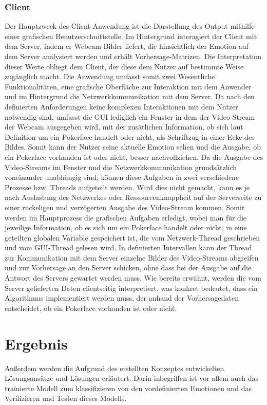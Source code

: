 \documentclass[12pt, a4paper]{scrbook}
\begin{document}
\subsection{Client}
Der Hauptzweck des Client-Anwendung ist die Darstellung des Output mithilfe einer grafischen Benutzerschnittstelle. Im Hintergrund interagiert der Client mit dem Server, indem er Webcam-Bilder liefert, die hinsichtlich der Emotion auf dem Server analysiert werden und erhält Vorhersage-Matrizen. Die Interpretation dieser Werte obliegt dem Client, der diese dem Nutzer auf bestimmte Weise zugänglich macht. Die Anwendung umfasst somit zwei Wesentliche Funktionalitäten, eine grafische Oberfläche zur Interaktion mit dem Anwender und im Hintergrund die Netzwerkkommunikation mit dem Server. Da nach den definierten Anforderungen keine komplexen Interaktionen mit dem Nutzer notwendig sind, umfasst die GUI lediglich ein Fenster in dem der Video-Stream der Webcam ausgegeben wird, mit der zusätlichen Information, ob sich laut Definition um ein Pokerface handelt oder nicht, als Schriftzug in einer Ecke des Bildes. Somit kann der Nutzer seine aktuelle Emotion sehen und die Ausgabe, ob ein Pokerface vorhanden ist oder nicht, besser nachvollziehen. Da die Ausgabe des Video-Streams im Fenster und die Netzwerkkommunikation grundsätzlich voneinander unabhängig sind, können diese Aufgaben in zwei verschiedene Prozesse bzw. Threads aufgeteilt werden. Wird dies nicht gemacht, kann es je nach Auslastung des Netzwerkes oder Ressourcenknappheit auf der Serverseite zu einer ruckeligen und verzögerten Ausgabe des Video-Stream kommen. Somit werden im Hauptprozess die grafischen Aufgaben erledigt, wobei man für die jeweilige Information, ob es sich um ein Pokerface handelt oder nicht, in eine geteilten globalen Variable gespeichert ist, die vom Netzwerk-Thread geschrieben und vom GUI-Thread gelesen wird. In definierten Intervallen kann der Thread zur Kommunikation mit dem Server einzelne Bilder des Video-Streams abgreifen und zur Vorhersage an den Server schicken, ohne dass bei der Ausgabe auf die Antwort des Servers gewartet werden muss. Wie bereits erwähnt, werden die vom Server gelieferten Daten clientseitig interpretiert, was konkret bedeutet, dass ein Algorithmus implementiert werden muss, der anhand der Vorhersagedaten entscheidet, ob ein Pokerface vorhanden ist oder nicht. 

\chapter{Ergebnis}
Außerdem werden die Aufgrund des erstellten Konzeptes entwickelten Lösungsansätze und Lösungen erläutert. Darin inbegriffen ist vor allem auch das trainierte Modell zum klassifizieren von den vordefinierten Emotionen und das Verifizieren und Testen dieses Modells.
\end{document}
